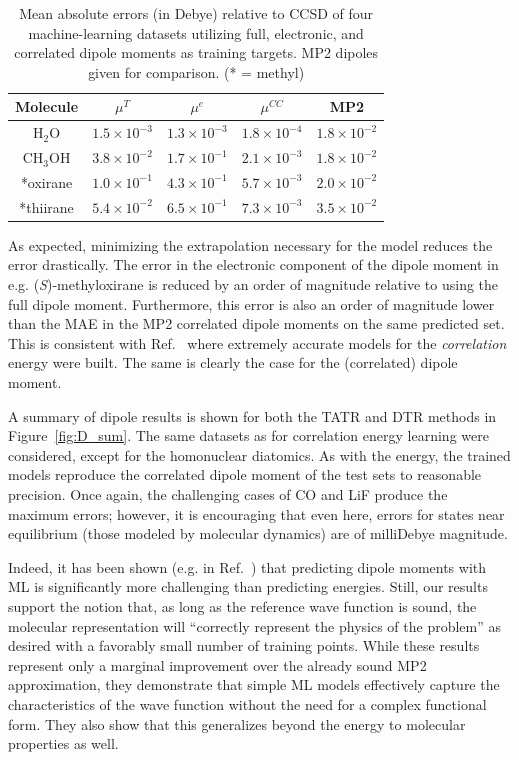 \begin{table}
\centering
\begin{tabular}{|c|c|c|c|c|}
    \hline
    Molecule & $\mu^{T}$ & $\mu^{e}$ & $\mu^{CC}$ & MP2 \\
    \hline
    H$_2$O & $1.5\times10^{-3}$ & $1.3\times10^{-3}$ & $1.8\times10^{-4}$ & $1.8\times10^{-2}$\\
    \hline
    CH$_3$OH & $3.8\times10^{-2}$ & $1.7\times10^{-1}$ & $2.1\times10^{-3}$ & $1.8\times10^{-2}$ \\
    \hline
    *oxirane & $1.0\times10^{-1}$ & $4.3\times10^{-1}$ & $5.7\times10^{-3}$ & $2.0\times10^{-2}$ \\
    \hline
    *thiirane & $5.4\times10^{-2}$ & $6.5\times10^{-1}$ & $7.3\times10^{-3}$ & $3.5\times10^{-2}$ \\
    \hline
\end{tabular}
\caption{Mean absolute errors (in Debye) relative to CCSD of four machine-learning datasets utilizing full, electronic, and correlated dipole moments as training targets. MP2 dipoles given for comparison. (* = methyl)} \label{table:separability}
\end{table}

As expected, minimizing the extrapolation necessary for the model reduces the error drastically. The error in the electronic component of the dipole moment in e.g. (\textit{S})-methyloxirane is reduced by an order of magnitude relative to using the full dipole moment. Furthermore, this error is also an order of magnitude lower than the MAE in the MP2 correlated dipole moments on the same predicted set. This is consistent with Ref.~ where extremely accurate models for the \textit{correlation} energy were built. The same is clearly the case for the (correlated) dipole moment.

A summary of dipole results is shown for both the TATR and DTR methods in Figure~\ref{fig:D_sum}.
The same datasets as for correlation energy learning were considered, except for the homonuclear diatomics. As with the energy, the trained models reproduce the correlated dipole moment of the test sets to reasonable precision. 
Once again, the challenging cases of CO and LiF produce the maximum errors; however, it is encouraging that even here, errors for states near equilibrium (those modeled by molecular dynamics) are of milliDebye magnitude. %

Indeed, it has been shown (e.g. in Ref.~) that predicting dipole moments with ML is significantly more challenging than predicting energies. 
Still, our results support the notion that, as long as the reference wave function is sound, the molecular representation will ``correctly represent the physics of the problem''\cite{Margraf2018} as desired with a favorably small number of training points. While these results represent only a marginal improvement over the already sound MP2 approximation, they demonstrate that simple ML models effectively capture the characteristics of the wave function without the need for a complex functional form. They also show that this generalizes beyond the energy to molecular properties as well. 

